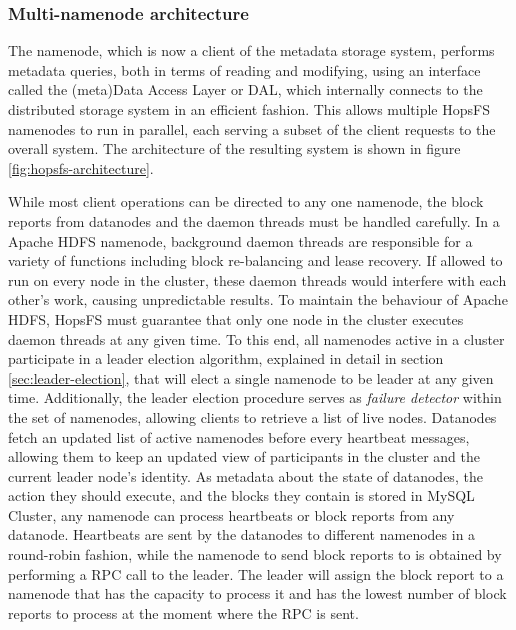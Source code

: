 \subsubsection{Multi-namenode architecture}
The namenode, which is now a client of the metadata storage system, performs metadata queries, both in terms of reading and modifying, using an interface called the (meta)Data Access Layer or DAL, which internally connects to the distributed storage system in an efficient fashion.
This allows multiple HopsFS namenodes to run in parallel, each serving a subset of the client requests to the overall system.
The architecture of the resulting system is shown in figure \ref{fig:hopsfs-architecture}.

While most client operations can be directed to any one namenode, the block reports from datanodes and the daemon threads must be handled carefully.
In a Apache HDFS namenode, background daemon threads are responsible for a variety of functions including block re-balancing and lease recovery.
If allowed to run on every node in the cluster, these daemon threads would interfere with each other's work, causing unpredictable results.
To maintain the behaviour of Apache HDFS, HopsFS must guarantee that only one node in the cluster executes daemon threads at any given time.
To this end, all namenodes active in a cluster participate in a leader election algorithm, explained in detail in section \ref{sec:leader-election}, that will elect a single namenode to be leader at any given time.
Additionally, the leader election procedure serves as \emph{failure detector} within the set of namenodes, allowing clients to retrieve a list of live nodes.
Datanodes fetch an updated list of active namenodes before every heartbeat messages, allowing them to keep an updated view of participants in the cluster and the current leader node's identity.
As metadata about the state of datanodes, the action they should execute, and the blocks they contain is stored in MySQL Cluster, any namenode can process heartbeats or block reports from any datanode.
Heartbeats are sent by the datanodes to different namenodes in a round-robin fashion, while the namenode to send block reports to is obtained by performing a RPC call to the leader.
The leader will assign the block report to a namenode that has the capacity to process it and has the lowest number of block reports to process at the moment where the RPC is sent.

